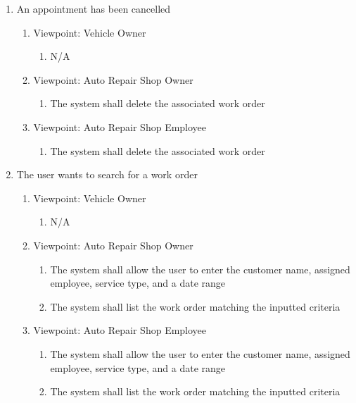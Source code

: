 \documentclass[12pt]{article}
\begin{document}
\begin{enumerate}[resume*=business_events]
	\item An appointment has been cancelled
	      \begin{enumerate}[VP\arabic*.]
		      \item Viewpoint: Vehicle Owner
		            \begin{enumerate}
			            \item[] N/A
		            \end{enumerate}
		      \item Viewpoint: Auto Repair Shop Owner
		            \begin{enumerate}
			            \item The system shall delete the associated work order
		            \end{enumerate}
		      \item Viewpoint: Auto Repair Shop Employee
		            \begin{enumerate}
			            \item The system shall delete the associated work order
		            \end{enumerate}
	      \end{enumerate}

	\item The user wants to search for a work order
	      \begin{enumerate}[VP\arabic*.]
		      \item Viewpoint: Vehicle Owner
		            \begin{enumerate}
			            \item[] N/A
		            \end{enumerate}
		      \item Viewpoint: Auto Repair Shop Owner
		            \begin{enumerate}
			            \item The system shall allow the user to enter the customer name, assigned employee, service type, and a
			                  date range
			            \item The system shall list the work order matching the inputted criteria
		            \end{enumerate}
		      \item Viewpoint: Auto Repair Shop Employee
		            \begin{enumerate}
			            \item The system shall allow the user to enter the customer name, assigned employee, service type, and a
			                  date range
			            \item The system shall list the work order matching the inputted criteria
		            \end{enumerate}
	      \end{enumerate}


\end{enumerate}
\end{document}
